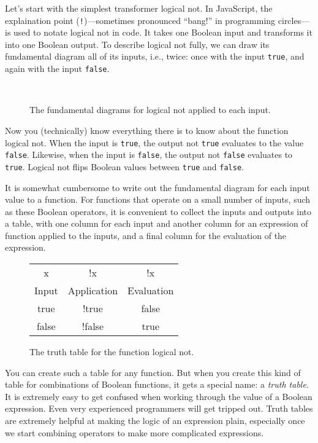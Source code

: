 Let's start with the simplest transformer logical \textsf{not}. In JavaScript,
the explaination point (\texttt{!})---sometimes pronounced ``bang!'' in
programming circles---is used to notate logical \textsf{not} in code. It takes
one \textsf{Boolean} input and transforms it into one \textsf{Boolean} output.
To describe logical \textsf{not} fully, we can draw its fundamental diagram all
of its inputs, i.e., twice: once with the input \texttt{true}, and again with
the input \texttt{false}.

\begin{figure}
  \\
  
\caption{\label{conds:not-fundamental-diagram.tex}The fundamental diagrams for
logical \textsf{not} applied to each input.}
\end{figure}

Now you (technically) know everything there is to know about the function
logical \textsf{not}. When the input is \texttt{true}, the output \textsf{not}
\texttt{true} evaluates to the value \texttt{false}. Likewise, when the input is
\texttt{false}, the output \textsf{not} \texttt{false} evaluates to
\texttt{true}. Logical \textsf{not} flips Boolean values between \texttt{true}
and \texttt{false}.

It is somewhat cumbersome to write out the fundamental diagram for each input
value to a function. For functions that operate on a small number of inputs,
such as these \textsf{Boolean} operators, it is convenient to collect the inputs
and outputs into a table, with one column for each input and another column for
an expression of function applied to the inputs, and a final column for the
evaluation of the expression.

\begin{figure}[h]
  \ttfamily
  \small
  \color{cyan}
  \begin{tabular}{c  c  c}
    x & !x & !x\\
    \textsf{Input} & \textsf{Application} & \textsf{Evaluation}\\
    \hline
    true & !true & false\\
    false & !false & true
  \end{tabular}
\caption{\label{fig:conditionals-logical-not} The truth table for the function
logical \textsf{not}.}
\end{figure}

You can create such a table for any function. But when you create this kind of
table for combinations of \textsf{Boolean} functions, it gets a special name: a
\emph{truth table}. It is extremely easy to get confused when working through
the value of a \textsf{Boolean} expression. Even very experienced programmers
will get tripped out.
Truth tables are extremely helpful at making the logic of an expression plain,
especially once we start combining operators to make more complicated
expressions.

